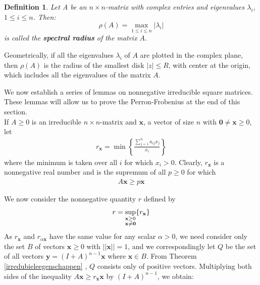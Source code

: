 \documentclass[a4paper,11pt]{report}
\newtheorem{definition}[theorem]{Definition}
\begin{document}
 \begin{definition}
  Let A be an $n\times n$-matrix with complex entries and eigenvalues $\lambda_i$,
  $1 \leq i \leq n$. Then:
  $$\rho(A) = \max_{1 \leq i \leq n} |\lambda_i|$$
  is called the \textbf{spectral radius} of the matrix $A$.
\end{definition}

Geometrically, if all the eigenvalues $\lambda_i$ of $A$ are plotted in the 
complex plane, then $\rho(A)$ is the radius of the smallest disk $|z| \leq 
R$, with center at the origin, which includes all the eigenvalues of the matrix 
$A$.

 We now establish a series of lemmas on nonnegative irreducible square matrices. 
 These lemmas will allow us to prove the Perron-Frobenius at the end of this
 section.\\
 
 If $A \geq 0$ is an irreducible $n\times n$-matrix and $\mathbf{x}$, a vector of size $n$ with $\mathbf{0} \not = \mathbf{x} \geq 0$, let
 \begin{eqnarray}
r_\mathbf{x} = \min\left\{\frac{\sum^n_{j=1}a_{ij}x_j}{x_i}\right\}
  \end{eqnarray}
 where the minimum is taken over all $i$ for which $x_i > 0$. Clearly, $r_\mathbf{x}$ is 
 a nonnegative real number and is the supremum of all $p \geq 0$ for 
 which 
  \begin{eqnarray}\label{eenvoudigefrob}
A\mathbf{x} \geq p\mathbf{x}  \end{eqnarray}
 
  We now consider the nonnegative quantity $r$ defined by 
 \begin{eqnarray}\label{eenvoudigefrob2}\label{quantityr}
   r = \sup_{\begin{subarray}{l}\mathbf{x} \geq 0\\
    \mathbf{x}\not = \mathbf{0}\end{subarray}} \{r_\mathbf{x}\}
 \end{eqnarray}
As $r_{\mathbf{x}}$ and $r_{\alpha\mathbf{x}}$ 
have the same value for any 
scalar $\alpha > 0$, we need consider only the set $B$ of vectors $\mathbf{x} \geq 0$ 
with $||\mathbf{x}|| = 1$, and we correspondingly let $Q$ be the set of all vectors $\mathbf{y}=(I+A)^{n-1}\mathbf{x}$ 
where $\mathbf{x} \in B$. From Theorem \ref{irredubieleegenschappen} , $Q$ 
consists only of positive vectors. Multiplying both sides of the inequality $A\mathbf{x} \geq r_{\mathbf{x}}\mathbf{x}$
by $(I+A)^{n-1}$, we obtain:
\end{document}
